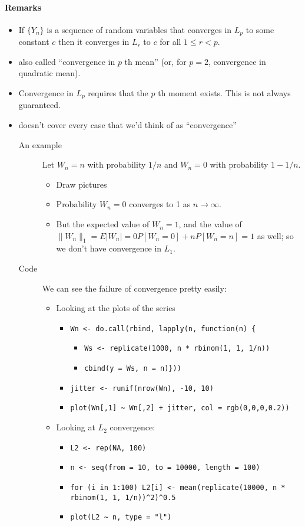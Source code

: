 \paragraph{Remarks}
\begin{itemize}
\item If $\{Y_n\}$ is a sequence of random variables that converges in
        $L_p$ to some constant $c$ then it converges in $L_r$ to $c$ for
        all $1 \leq r < p$.
\item also called ``convergence in $p$ th mean'' (or, for $p = 2$,
        convergence in quadratic mean).
\item Convergence in $L_p$ requires that the $p$ th moment exists.
        This is not always guaranteed.
\item doesn't cover every case that we'd think of as ``convergence''
\begin{description}
\item[An example] Let $W_n = n$ with probability $1/n$ and $W_n = 0$
          with probability $1 - 1/n$.
\begin{itemize}
\item Draw pictures
\item Probability $W_n = 0$ converges to 1 as $n \to \infty$.
\item But the expected value of $W_n = 1$, and the value of $\lVert
            W_n \rVert_1 = E | W_n | = 0 P[W_n = 0] + n P[W_n = n] = 1$
            as well; so we don't have convergence in $L_1$.
\end{itemize}
\item[Code] We can see the failure of convergence pretty easily:
\begin{itemize}
\item Looking at the plots of the series
\begin{itemize}
\item \texttt{Wn <- do.call(rbind, lapply(n, function(n) \{}
\begin{itemize}
\item \texttt{Ws <- replicate(1000, n * rbinom(1, 1, 1/n))}
\item \texttt{cbind(y = Ws, n = n)\}))}
\end{itemize}
\item \texttt{jitter <- runif(nrow(Wn), -10, 10)}
\item \texttt{plot(Wn[,1] \textasciitilde{} Wn[,2] + jitter, col = rgb(0,0,0,0.2))}
\end{itemize}
\item Looking at $L_2$ convergence:
\begin{itemize}
\item \texttt{L2 <- rep(NA, 100)}
\item \texttt{n <- seq(from = 10, to = 10000, length = 100)}
\item \texttt{for (i in 1:100)                  L2[i] <- mean(replicate(10000, n * rbinom(1, 1, 1/n))\textasciicircum{}2)\textasciicircum{}0.5}
\item \texttt{plot(L2 \textasciitilde{} n, type = "l")}
\end{itemize}
\end{itemize}
\end{description}
\end{itemize}

